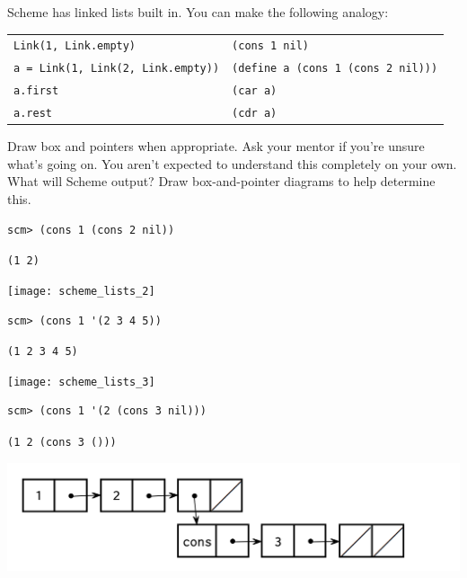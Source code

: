 \begin{nonsol}
Scheme has linked lists built in. You can make the following analogy:
\begin{center}
\begin{tabular}{ |l|l| }
\hline
 \texttt{Link(1, Link.empty)} & \texttt{(cons 1 nil)} \\
 \texttt{a = Link(1, Link(2, Link.empty))} & \texttt{(define a (cons 1 (cons 2 nil)))}  \\
 \texttt{a.first} & \texttt{(car a)} \\
 \texttt{a.rest} & \texttt{(cdr a)} \\
 \hline
\end{tabular}

\end{center}
 Draw box and pointers when appropriate. Ask your mentor if you're unsure what's going on. You aren't expected to understand this completely on your own.
\question What will Scheme output? Draw box-and-pointer diagrams to help determine this.
\end{nonsol}


\begin{lstlisting}
scm> (cons 1 (cons 2 nil))
\end{lstlisting}
\begin{solution}[0.25in]
\texttt{(1 2)}
\begin{center}
\texttt{[image: scheme\_lists\_2]}
\end{center}
\end{solution}

\begin{lstlisting}
scm> (cons 1 '(2 3 4 5))
\end{lstlisting}
\begin{solution}[0.25in]
\texttt{(1 2 3 4 5)}
\begin{center}
\texttt{[image: scheme\_lists\_3]}
\end{center}
\end{solution}

\begin{lstlisting}
scm> (cons 1 '(2 (cons 3 nil)))
\end{lstlisting}
\begin{solution}[0.25in]
\texttt{(1 2 (cons 3 ()))}
\begin{center}
\includegraphics[scale=0.7]{scheme_lists_5}
\end{center}
\end{solution}

